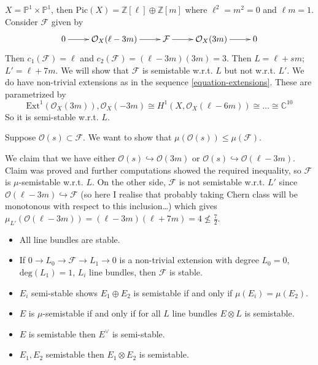 \begin{example}
\label{example-stability-depends-on-choice-of-ample-divisor}
$X=\mathbb{P}^1\times \mathbb{P}^1$, then $\text{Pic}(X)
=\mathbb{Z}[\ell]\oplus\mathbb{Z}[m]$ where $\ell^2=m^2=0$ and $\ell m=1$.
Consider $\mathcal{F}$ given by
\begin{equation}
\label{equation-extensions}
\xymatrix{
0\ar[r]&\mathcal{O}_X(\ell-3m)\ar[r]&\mathcal{F}\ar[r]&\mathcal{O}_X(3m)
\ar[r]&0
}
\end{equation}
Then $c_1(\mathcal{F})=\ell$ and $c_2(\mathcal{F})=(\ell-3m)(3m)=3$. Then
$L=\ell+sm$; $L'=\ell+7m$. We will show
that $\mathcal{F}$ is semistable w.r.t. $L$ but not w.r.t. $L'$. We do have
non-trivial extensions as in the sequence \ref{equation-extensions}. These are
parametrized by 
$$
\text{Ext}^1(\mathcal{O}_X(3m)), \mathcal{O}_X(-3m)\cong
H^{1}(X,\mathcal{O}_X(\ell-6m))\cong \ldots \cong \mathbb{C}^{10}
$$
So it is semi-stable w.r.t. $L$.

Suppose $\mathcal{O}(s) \subset \mathcal{F}$. We want to show that
$\mu(\mathcal{O}(s)) \leq  \mu(\mathcal{F})$. 

We claim that we have either $\mathcal{O}(s)\hookrightarrow \mathcal{O}(3m)$ or
$\mathcal{O}(s)\hookrightarrow \mathcal{O}(\ell-3m)$. Claim was proved and
further computations showed the required inequality, so $\mathcal{F}$ is
$\mu$-semistable w.r.t. $L$. On the other side, $\mathcal{F}$ is not semistable
w.r.t.  $L'$ since $\mathcal{O}(\ell-3m) \hookrightarrow  \mathcal{F}$ (so here
I realise that probably taking Chern class will be monotonous with respect to
this inclusion…) which gives
$\mu_{L'}(\mathcal{O}(\ell-3m))=(\ell-3m)(\ell+7m)=4\not \leq \frac{7}{2}$.
\end{example}

\begin{example}
\label{example-results-on-mu-stability}
\begin{itemize}
\item All line bundles are stable.
\item If $0\to L_0 \to \mathcal{F} \to L_1 \to 0$ is a non-trivial extension
with degree $L_0=0$, $\text{deg}(L_1)=1$, $L_i$ line bundles, then
$\mathcal{F}$ is stable.
\item $E_i$ semi-stable shows $E_1\oplus E_2$ is semistable if and only if
$\mu(E_i)=\mu(E_2)$.
\item $E$ is $\mu$-semistable if and only if for all $L$ line bundles $E \otimes
L$ is semistable.
\item $E$ is semistable then $E^{\vee}$ is semi-stable.
\item $E_1,E_2$ semistable then $E_1 \otimes E_2$ is semistable.
\end{itemize}
\end{example}

